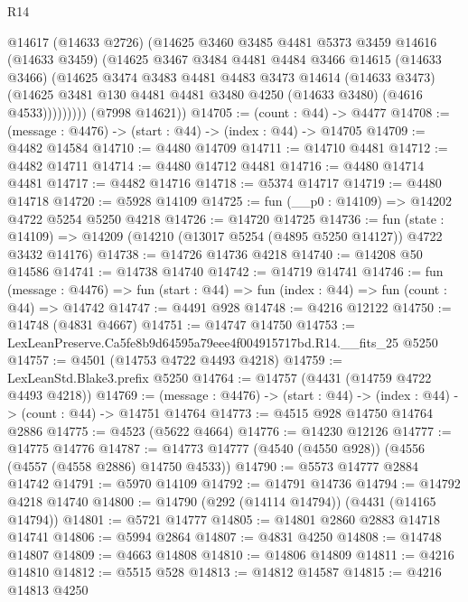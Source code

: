 \begin{lexlean}{R14}
\begin{coremodule}
              @14617
              (@14633 @2726)
              (@14625
                @3460
                @3485
                @4481
                @5373
                @3459
                @14616
                (@14633 @3459)
                (@14625
                  @3467
                  @3484
                  @4481
                  @4484
                  @3466
                  @14615
                  (@14633 @3466)
                  (@14625
                    @3474
                    @3483
                    @4481
                    @4483
                    @3473
                    @14614
                    (@14633 @3473)
                    (@14625 @3481 @130 @4481 @4481 @3480 @4250 (@14633 @3480) (@4616 @4533)))))))))
      (@7998 @14621))
@14705 := (count : @44) -> @4477
@14708 := (message : @4476) -> (start : @44) -> (index : @44) -> @14705
@14709 := @4482 @14584
@14710 := @4480 @14709
@14711 := @14710 @4481
@14712 := @4482 @14711
@14714 := @4480 @14712 @4481
@14716 := @4480 @14714 @4481
@14717 := @4482 @14716
@14718 := @5374 @14717
@14719 := @4480 @14718
@14720 := @5928 @14109
@14725 := fun (__p0 : @14109) => @14202 @4722 @5254 @5250 @4218
@14726 := @14720 @14725
@14736 := fun (state : @14109) =>
  @14209 (@14210 (@13017 @5254 (@4895 @5250 @14127)) @4722 @3432 @14176)
@14738 := @14726 @14736 @4218
@14740 := @14208 @50 @14586
@14741 := @14738 @14740
@14742 := @14719 @14741
@14746 := fun (message : @4476) =>
  fun (start : @44) => fun (index : @44) => fun (count : @44) => @14742
@14747 := @4491 @928
@14748 := @4216 @12122
@14750 := @14748 (@4831 @4667)
@14751 := @14747 @14750
@14753 := LexLeanPreserve.Ca5fe8b9d64595a79eee4f004915717bd.R14.__fits_25 @5250
@14757 := @4501 (@14753 @4722 @4493 @4218)
@14759 := LexLeanStd.Blake3.prefix @5250
@14764 := @14757 (@4431 (@14759 @4722 @4493 @4218))
@14769 := (message : @4476) -> (start : @44) -> (index : @44) -> (count : @44) -> @14751 @14764
@14773 := @4515 @928 @14750 @14764 @2886
@14775 := @4523 (@5622 @4664)
@14776 := @14230 @12126
@14777 := @14775 @14776
@14787 := @14773 @14777 (@4540 (@4550 @928)) (@4556 (@4557 (@4558 @2886) @14750 @4533))
@14790 := @5573 @14777 @2884 @14742
@14791 := @5970 @14109
@14792 := @14791 @14736
@14794 := @14792 @4218 @14740
@14800 := @14790 (@292 (@14114 @14794)) (@4431 (@14165 @14794))
@14801 := @5721 @14777
@14805 := @14801 @2860 @2883 @14718 @14741
@14806 := @5994 @2864
@14807 := @4831 @4250
@14808 := @14748 @14807
@14809 := @4663 @14808
@14810 := @14806 @14809
@14811 := @4216 @14810
@14812 := @5515 @528
@14813 := @14812 @14587
@14815 := @4216 @14813 @4250

\end{coremodule}
\end{lexlean}
